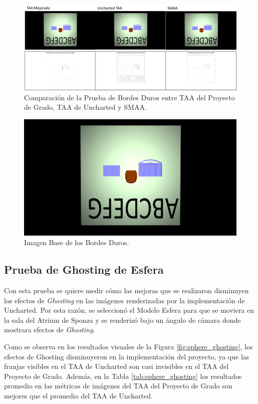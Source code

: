 \documentclass[pregrado]{tesis-usb} %
\begin{document}
\begin{figure}[!htb]
	\centering
	\includegraphics[scale=0.4]{images/results/hard_test.png}
	\caption{Comparación de la Prueba de Bordes Duros entre TAA del Proyecto de Grado, TAA de Uncharted y SMAA.}\label{fig:hard_test_render}
\end{figure}

\begin{figure}[!htb]
	\centering
	\includegraphics[scale=0.09]{images/results/hard_test_sobel_ground_truth.png}
	\caption{Imagen Base de los Bordes Duros.}\label{fig:hard_test_truth}
\end{figure}

\FloatBarrier

\subsection{Prueba de Ghosting de Esfera}
Con esta prueba se quiere medir cómo las mejoras que se realizaron disminuyen los efectos de \textit{Ghosting} en las imágenes renderizadas por la implementación de Uncharted. Por esta razón, se seleccionó el Modelo Esfera para que se moviera en la sala del Atrium de Sponza y se renderizó bajo un ángulo de cámara donde mostrara efectos de \textit{Ghosting}.

Como se observa en los resultados visuales de la Figura \ref{fig:sphere_ghosting}, los efectos de  Ghosting disminuyeron en la implementación del proyecto, ya que las franjas visibles en el TAA de Uncharted son casi invisibles en el TAA del Proyecto de Grado. Además, en la Tabla \ref{tab:sphere_ghosting} los resultados promedio en las métricas de imágenes del TAA del Proyecto de Grado son mejores que el promedio del TAA de Uncharted.
\end{document}
